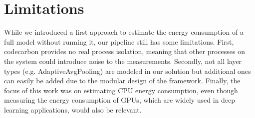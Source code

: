 \section{Limitations}
\label{sec:limitations}
While we introduced a first approach to estimate the energy consumption of a full model without running it, our pipeline still has some limitations. First, codecarbon provides no real process isolation, meaning that other processes on the system could introduce noise to the measurements. Secondly, not all layer types (e.g. AdaptiveAvgPooling) are modeled in our solution but additional ones can easily be added due to the modular design of the framework. Finally, the focus of this work was on estimating CPU energy consumption, even though measuring the energy consumption of GPUs, which are widely used in deep learning applications, would also be relevant.